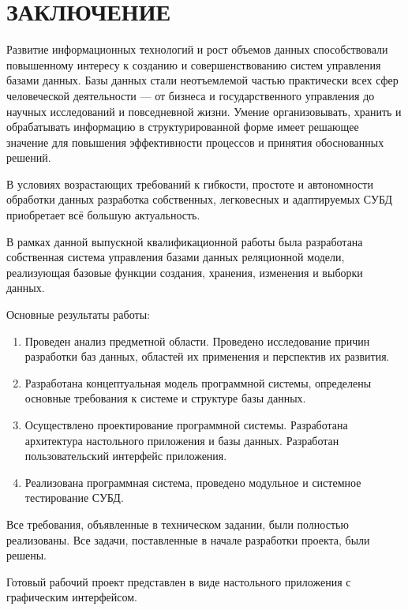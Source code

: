 \section*{ЗАКЛЮЧЕНИЕ}

Развитие информационных технологий и рост объемов данных способствовали повышенному интересу к созданию и совершенствованию систем управления базами данных. Базы данных стали неотъемлемой частью практически всех сфер человеческой деятельности — от бизнеса и государственного управления до научных исследований и повседневной жизни. Умение организовывать, хранить и обрабатывать информацию в структурированной форме имеет решающее значение для повышения эффективности процессов и принятия обоснованных решений.

В условиях возрастающих требований к гибкости, простоте и автономности обработки данных разработка собственных, легковесных и адаптируемых СУБД приобретает всё большую актуальность.

В рамках данной выпускной квалификационной работы была разработана собственная система управления базами данных реляционной модели, реализующая базовые функции создания, хранения, изменения и выборки данных.

Основные результаты работы:

\begin{enumerate}
\item Проведен анализ предметной области. Проведено исследование причин разработки баз данных, областей их применения и перспектив их развития.
\item Разработана концептуальная модель программной системы, определены основные требования к системе и структуре базы данных.
\item Осуществлено проектирование программной системы. Разработана архитектура настольного приложения и базы данных. Разработан пользовательский интерфейс приложения.
\item Реализована программная система, проведено модульное и системное тестирование СУБД.
\end{enumerate}

Все требования, объявленные в техническом задании, были полностью реализованы. Все задачи, поставленные в начале разработки проекта, были решены.

Готовый рабочий проект представлен в виде настольного приложения с графическим интерфейсом.
